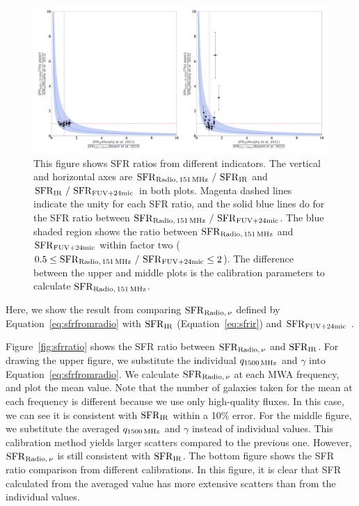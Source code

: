 \begin{figure}[htbp]
	\centering
	\includegraphics[width=\linewidth]{Chapter_5/Figures/Result_sfrratios.pdf}
    \caption[The consistency of the radio SFR with $\mr{SFR}\msb{IR}$ and $\mr{SFR}\msb{FUV+24mic}$]{\label{fig:sfrratios}
        This figure shows SFR ratios from different indicators.
        The vertical and horizontal axes are $\mr{SFR}\msb{Radio,\,151\MHz}\ /\ \mr{SFR}\msb{IR}$ and $\mr{SFR}\msb{IR}\ /\ \mr{SFR}\msb{FUV+24mic}$ in both plots.
        Magenta dashed lines indicate the unity for each SFR ratio, and the solid blue lines do for the SFR ratio between $\mr{SFR}\msb{Radio,\,151\MHz}\ /\ \mr{SFR}\msb{FUV+24mic}$.
        The blue shaded region shows the ratio between $\mathrm{SFR}_{\mathrm{Radio},\,151\,\mathrm{MHz}}$ and $\mr{SFR}\msb{FUV+24mic}$ within factor two ($0.5 \leq \mr{SFR}_{\mr{Radio},\,151\MHz}\ /\ \mr{SFR}\msb{FUV+24mic} \leq 2$).
        The difference between the upper and middle plots is the calibration parameters to calculate $\mathrm{SFR}_{\mathrm{Radio},\,151\,\mathrm{MHz}}$.
    }
\end{figure}

Here, we show the result from comparing $\mathrm{SFR}_{\mathrm{Radio},\,\nu}$ defined by Equation~\ref{eq:sfrfromradio} with $\mr{SFR}\msb{IR}$ (Equation~\ref{eq:sfrir}) and $\mr{SFR}\msb{FUV+24mic}$ \citep{Boselli2015}.

Figure~\ref{fig:sfrratio} shows the SFR ratio between $\mathrm{SFR}_{\mathrm{Radio},\,\nu}$ and $\mr{SFR}\msb{IR}$.
For drawing the upper figure, we substitute the individual $q_{1500\,\mathrm{MHz}}$ and $\gamma$ into Equation~\ref{eq:sfrfromradio}.
We calculate $\mathrm{SFR}_{\mathrm{Radio},\,\nu}$ at each MWA frequency, and plot the mean value.
Note that the number of galaxies taken for the mean at each frequency is different because we use only high-quality fluxes.
In this case, we can see it is consistent with $\mr{SFR}\msb{IR}$ within a 10\% error.
For the middle figure, we substitute the averaged $q_{1500\,\mathrm{MHz}}$ and $\gamma$ instead of individual values.
This calibration method yields larger scatters compared to the previous one.
However, $\mathrm{SFR}_{\mathrm{Radio},\,\nu}$ is still consistent with $\mr{SFR}\msb{IR}$.
The bottom figure shows the SFR ratio comparison from different calibrations.
In this figure, it is clear that SFR calculated from the averaged value has more extensive scatters than from the individual values.

